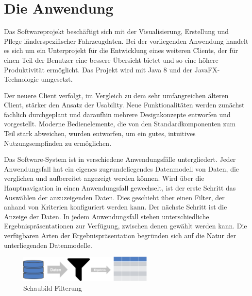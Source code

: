 \section{Die Anwendung} \label{sec:application}
Das Softwareprojekt beschäftigt sich mit der Visualisierung, Erstellung und Pflege länderspezifischer Fahrzeugdaten. Bei der vorliegenden Anwendung handelt es sich um ein Unterprojekt für die Entwicklung eines weiteren Clients, der für einen Teil der Benutzer eine bessere Übersicht bietet und so eine höhere Produktivität ermöglicht. Das Projekt wird mit Java 8 und der JavaFX-Technologie umgesetzt.\par
Der neuere Client verfolgt, im Vergleich zu dem sehr umfangreichen älteren Client, stärker den Ansatz der Usability. Neue Funktionalitäten werden zunächst fachlich durchgeplant und daraufhin mehrere Designkonzepte entworfen und vorgestellt. Moderne Bedienelemente, die von den Standardkomponenten zum Teil stark abweichen, wurden entworfen, um ein gutes, intuitives Nutzungsempfinden zu ermöglichen.\par
Das Software-System ist in verschiedene Anwendungsfälle untergliedert. Jeder Anwendungsfall hat ein eigenes zugrundeliegendes Datenmodell von Daten, die verglichen und aufbereitet angezeigt werden können. Wird über die Hauptnavigation in einen Anwendungsfall gewechselt, ist der erste Schritt das Auswählen der anzuzeigenden Daten. Dies geschieht über einen Filter, der anhand von Kriterien konfiguriert werden kann. Der nächste Schritt ist die Anzeige der Daten. In jedem Anwendungsfall stehen unterschiedliche Ergebnispräsentationen zur Verfügung, zwischen denen gewählt werden kann. Die verfügbaren Arten der Ergebnispräsentation begründen sich auf die Natur der unterliegenden Datenmodelle.\par
\begin{figure}[H]
 \centering
 \includegraphics[width=0.6\textwidth]{grafiken/schaubild_filter.png}
 \caption{Schaubild Filterung}
 \label{fig:conceptFilter}
\end{figure}